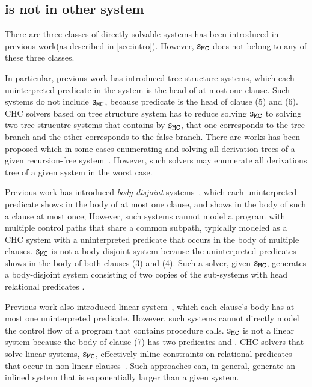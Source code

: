 \subsection{ is not in other system}
\label{sec:not-in}
%
There are three classes of directly solvable systems has been introduced
in previous work(as described in \autoref{sec:intro}).
%
However, $\mcchc$ does not belong to any of these three classes.
%

In particular, previous work has introduced tree structure systems\cite{bjorner13,heizmann10},
which each uninterpreted predicate in the system is the head of at most one clause.
%
Such systems do not include $\mcchc$, because predicate  is the head 
of clause (5) and (6).
%
CHC solvers based on tree structure system has to reduce solving $\mcchc$ to
solving two tree strucutre systems that contains by $\mcchc$, that one corresponds
to the tree branch and the other corresponds to the false branch.
There are works has been proposed which in some cases enumerating 
and solving all derivation trees 
of a given recursion-free
system~\cite{mcmillan14}.
%
However, such solvers may enumerate all derivations tree of a given system
in the worst case.

Previous work has introduced \emph{body-disjoint}
systems~\cite{rummer13a,rummer13b}, 
which each uninterpreted predicate shows in the body of at most one
clause, and shows in the body of such a clause at most once;
%
However, such systems cannot model a program with multiple
control paths that share a common subpath, typically modeled as a CHC
system with a uninterpreted predicate that occurs in the body of multiple clauses.
%
$\mcchc$ is not a body-disjoint system because the uninterpreted
predicates  shows in the body of both clauses (3) and (4).
%
Such a solver, given $\mcchc$, generates a body-disjoint system
consisting of two copies of the sub-systems with head relational
predicates .

Previous work also introduced linear system~\cite{albarghouthi12a}, 
which each clause's body has at most one uninterpreted predicate.
%
However, such systems cannot directly model the control flow of a
program that contains procedure calls.
%
$\mcchc$ is not a linear system because the body of clause (7) has two
predicates  and .
%
CHC solvers that solve linear systems, $\mcchc$, effectively inline constraints on
relational predicates that occur in non-linear clauses~\cite{albarghouthi12b}.
%
Such approaches can, in general, generate an inlined system that is
exponentially larger than a given system.

